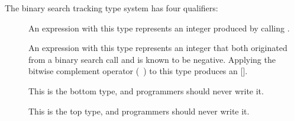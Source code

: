 The binary search tracking type system has four qualifiers:
\begin{description}
\item[]
  An expression with this type represents an integer produced by
  calling .
\item[]
  An expression with this type represents an integer that both originated
  from a binary search call and is known to be negative. Applying the bitwise
  complement operator (~) to this type produces an [].
\item[]
  This is the bottom type, and programmers should never write it.
\item[]
  This is the top type, and programmers should never write it.
\end{description}

